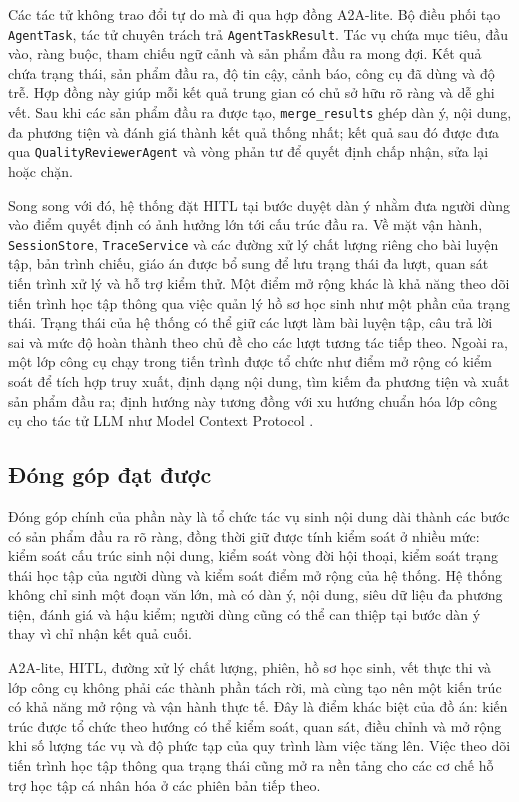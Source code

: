 \documentclass[../DoAn.tex]{subfiles}
\begin{document}
Các tác tử không trao đổi tự do mà đi qua hợp đồng A2A-lite. Bộ điều phối tạo \texttt{AgentTask}, tác tử chuyên trách trả \texttt{AgentTaskResult}. Tác vụ chứa mục tiêu, đầu vào, ràng buộc, tham chiếu ngữ cảnh và sản phẩm đầu ra mong đợi. Kết quả chứa trạng thái, sản phẩm đầu ra, độ tin cậy, cảnh báo, công cụ đã dùng và độ trễ. Hợp đồng này giúp mỗi kết quả trung gian có chủ sở hữu rõ ràng và dễ ghi vết. Sau khi các sản phẩm đầu ra được tạo, \texttt{merge\_results} ghép dàn ý, nội dung, đa phương tiện và đánh giá thành kết quả thống nhất; kết quả sau đó được đưa qua \texttt{QualityReviewerAgent} và vòng phản tư để quyết định chấp nhận, sửa lại hoặc chặn.

Song song với đó, hệ thống đặt HITL tại bước duyệt dàn ý nhằm đưa người dùng vào điểm quyết định có ảnh hưởng lớn tới cấu trúc đầu ra. Về mặt vận hành, \texttt{SessionStore}, \texttt{TraceService} và các đường xử lý chất lượng riêng cho bài luyện tập, bản trình chiếu, giáo án được bổ sung để lưu trạng thái đa lượt, quan sát tiến trình xử lý và hỗ trợ kiểm thử. Một điểm mở rộng khác là khả năng theo dõi tiến trình học tập thông qua việc quản lý hồ sơ học sinh như một phần của trạng thái. Trạng thái của hệ thống có thể giữ các lượt làm bài luyện tập, câu trả lời sai và mức độ hoàn thành theo chủ đề cho các lượt tương tác tiếp theo. Ngoài ra, một lớp công cụ chạy trong tiến trình được tổ chức như điểm mở rộng có kiểm soát để tích hợp truy xuất, định dạng nội dung, tìm kiếm đa phương tiện và xuất sản phẩm đầu ra; định hướng này tương đồng với xu hướng chuẩn hóa lớp công cụ cho tác tử LLM như Model Context Protocol \cite{anthropic2024mcp,ehtesham2025agentprotocols}.

\subsection{Đóng góp đạt được}

Đóng góp chính của phần này là tổ chức tác vụ sinh nội dung dài thành các bước có sản phẩm đầu ra rõ ràng, đồng thời giữ được tính kiểm soát ở nhiều mức: kiểm soát cấu trúc sinh nội dung, kiểm soát vòng đời hội thoại, kiểm soát trạng thái học tập của người dùng và kiểm soát điểm mở rộng của hệ thống. Hệ thống không chỉ sinh một đoạn văn lớn, mà có dàn ý, nội dung, siêu dữ liệu đa phương tiện, đánh giá và hậu kiểm; người dùng cũng có thể can thiệp tại bước dàn ý thay vì chỉ nhận kết quả cuối.

A2A-lite, HITL, đường xử lý chất lượng, phiên, hồ sơ học sinh, vết thực thi và lớp công cụ không phải các thành phần tách rời, mà cùng tạo nên một kiến trúc có khả năng mở rộng và vận hành thực tế. Đây là điểm khác biệt của đồ án: kiến trúc được tổ chức theo hướng có thể kiểm soát, quan sát, điều chỉnh và mở rộng khi số lượng tác vụ và độ phức tạp của quy trình làm việc tăng lên. Việc theo dõi tiến trình học tập thông qua trạng thái cũng mở ra nền tảng cho các cơ chế hỗ trợ học tập cá nhân hóa ở các phiên bản tiếp theo.
\end{document}

